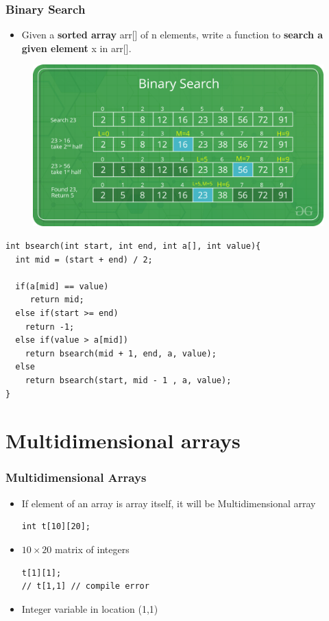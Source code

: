 \documentclass{../c-lecture}
\begin{document}
\begin{frame}
  \frametitle{Binary Search}
  \begin{itemize}
    \item
      Given a \textbf{\color{YellowOrange} sorted array} arr[] of n elements,
      write a function to
      \textbf{\color{GreenYellow} search a given element} x in arr[].
  \end{itemize}
  \begin{figure}
    \includegraphics[width=.75\textwidth]{./img/binary-search.png}
  \end{figure}
\end{frame}

\begin{frame}[fragile]
  \scriptsize
  \begin{verbatim}
int bsearch(int start, int end, int a[], int value){
  int mid = (start + end) / 2;

  if(a[mid] == value)
     return mid;
  else if(start >= end)
    return -1;
  else if(value > a[mid])
    return bsearch(mid + 1, end, a, value);
  else
    return bsearch(start, mid - 1 , a, value);
}
  \end{verbatim}
\end{frame}

\section{Multidimensional arrays}

\begin{frame}[fragile]
  \frametitle{Multidimensional Arrays}
  \begin{itemize}
    \item
      If element of an array is array itself, it will be Multidimensional array

    \begin{verbatim}
int t[10][20];
    \end{verbatim}
    \item $10 \times 20$ matrix of integers
    \begin{verbatim}
t[1][1];
// t[1,1] // compile error
    \end{verbatim}
    \item Integer variable in location (1,1)
  \end{itemize}
\end{frame}
\end{document}

